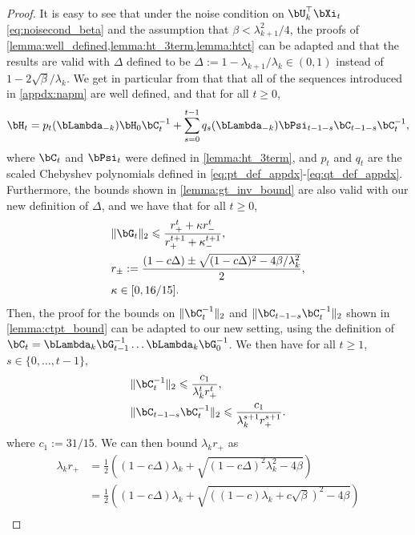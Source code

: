\documentclass{article}
\theoremstyle{plain}
\theoremstyle{definition}
\theoremstyle{remark}
\begin{document}
\begin{proof}
  It is easy to see that under the noise condition on $\bU_k^\top\bXi_t$ \eqref{eq:noisecond_beta} and the assumption that $\beta < \lambda_{k+1}^2/4$, the proofs of \cref{lemma:well_defined,lemma:ht_3term,lemma:htct} can be adapted and that the results are valid with $\Delta$ defined to be $\Delta := 1 - \lambda_{k+1}/\lambda_k \in (0,1)$ instead of $1-2\sqrt{\beta}/\lambda_k$. We get in particular from that that all of the sequences introduced in \cref{appdx:napm} are well defined, and that for all $t\geqslant 0$,
  \begin{align}
    \bH_t = p_t(\bLambda_{-k}) \bH_0 \bC_t^{-1} + \sum_{s=0}^{t-1} q_s(\bLambda_{-k}) \bPsi_{t-1-s} \bC_{t-1-s} \bC_t^{-1}, \label{eq:ht_formula}
  \end{align}
  where $\bC_t$ and $\bPsi_t$ were defined in \cref{lemma:ht_3term}, and $p_t$ and $q_t$ are the scaled Chebyshev polynomials defined in \eqref{eq:pt_def_appdx}-\eqref{eq:qt_def_appdx}. Furthermore, the bounds shown in \cref{lemma:gt_inv_bound} are also valid with our new definition of $\Delta$, and we have that for all $t\geqslant 0$,
  \begin{align*}
    & \Vert\bG_t\Vert_2 \leqslant \frac{r_+^t + \kappa r_-^t}{r_+^{t+1} + \kappa_-^{t+1}},\\
    & r_\pm := \frac{(1-c\Delta) \pm \sqrt{(1-c\Delta)^2 - 4\beta/\lambda_k^2}}{2},\\
    & \kappa \in [0,16/15].
  \end{align*}
  Then, the proof for the bounds on $\Vert\bC_t^{-1}\Vert_2$ and $\Vert\bC_{t-1-s}\bC_t^{-1}\Vert_2$ shown in \cref{lemma:ctpt_bound} can be adapted to our new setting, using the definition of $\bC_t = \bLambda_k \bG_{t-1}^{-1}\dots \bLambda_k \bG_{0}^{-1}$. We then have for all $t\geqslant 1$, $s \in \{0,\dots,t-1\}$,
  \begin{align*}
    & \Vert \bC_t^{-1} \Vert_2 \leqslant \frac{c_1}{\lambda_k^t r_+^t},\\
    & \Vert \bC_{t-1-s} \bC_t^{-1} \Vert_2 \leqslant \frac{c_1}{\lambda_k^{s+1} r_+^{s+1}}.
  \end{align*}
  where $c_1 := 31/15$. We can then bound $\lambda_k r_+$ as
  \begin{align*}
    \lambda_k r_+ & = \frac{1}{2}\left( (1 - c\Delta)\lambda_k + \sqrt{(1 - c\Delta)^2\lambda_k^2  - 4\beta} \right) \\
    & = \frac{1}{2}\left( (1 - c\Delta)\lambda_k + \sqrt{\left((1 - c)\lambda_k + c\sqrt{\beta}\right)^2  - 4\beta} \right) \\

\end{align*}
\end{proof}
\end{document}
